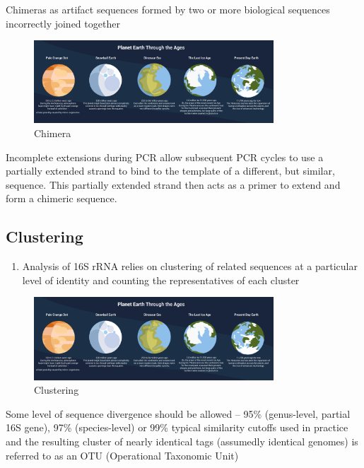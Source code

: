 \documentclass[
]{book}
\providecommand{\tightlist}{%
  \setlength{\itemsep}{0pt}\setlength{\parskip}{0pt}}
\begin{document}
Chimeras as artifact sequences formed by two or more biological sequences incorrectly joined together

\begin{figure}
\centering
\includegraphics[width=0.8\textwidth,height=\textheight]{./Figures/Planets.png}
\caption{Chimera}
\end{figure}

Incomplete extensions during PCR allow subsequent PCR cycles to use a partially extended strand to bind to the template of a different, but similar, sequence. This partially extended strand then acts as a primer to extend and form a chimeric sequence.

\hypertarget{clustering}{%
\subsection{Clustering}\label{clustering}}

\begin{enumerate}
\def\labelenumi{\arabic{enumi}.}
\tightlist
\item
  Analysis of 16S rRNA relies on clustering of related sequences at a particular level of identity and counting the representatives of each cluster
\end{enumerate}

\begin{figure}
\centering
\includegraphics[width=0.8\textwidth,height=\textheight]{./Figures/Planets.png}
\caption{Clustering}
\end{figure}

Some level of sequence divergence should be allowed -- 95\% (genus-level, partial 16S gene), 97\% (species-level) or 99\% typical similarity cutoffs used in
practice and the resulting cluster of nearly identical tags (assumedly identical genomes) is referred to as an OTU (Operational Taxonomic Unit)
\end{document}
